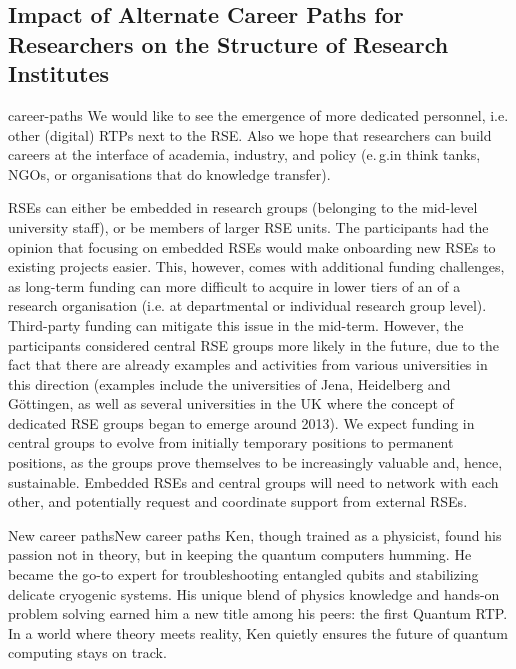 \documentclass{eceasst}
\newcommand{\eg}{e.\,g.}
\begin{document}
\subsection{Impact of Alternate Career Paths for Researchers on the Structure of Research Institutes}
\begin{whatis}{}{career-paths}
We would like to see the emergence of more dedicated personnel, i.e. other (digital) RTPs next to the RSE.
Also we hope that researchers can build careers at the interface of academia, industry, and policy (\eg in think tanks, NGOs,
or organisations that do knowledge transfer).
\end{whatis}
RSEs can either be embedded in research groups (belonging to the mid-level university staff),
or be members of larger RSE units.\cite{Kempf2025-draft}
The participants had the opinion that focusing on embedded RSEs would make onboarding new RSEs to existing projects easier.
This, however, comes with additional funding challenges,
as long-term funding can more difficult to acquire in lower tiers of an of a research organisation (i.e. at departmental or individual research group level).
Third-party funding can mitigate this issue in the mid-term.
However, the participants considered central RSE groups more likely in the future,
due to the fact that there are already examples and activities from various universities in this direction
(examples include the universities of Jena, Heidelberg and Göttingen, as well as several universities in the UK where the concept of dedicated RSE groups began to emerge around 2013).
We expect funding in central groups to evolve from initially temporary positions to permanent positions,
as the groups prove themselves to be increasingly valuable and, hence, sustainable.
Embedded RSEs and central groups will need to network with each other,
and potentially request and coordinate support from external RSEs.

\begin{story}{New career paths}{New career paths}
Ken, though trained as a physicist, found his passion not in theory, but in keeping the quantum computers humming. He became the go-to expert for troubleshooting entangled qubits and stabilizing delicate cryogenic systems. His unique blend of physics knowledge and hands-on problem solving earned him a new title among his peers: the first Quantum RTP. In a world where theory meets reality, Ken quietly ensures the future of quantum computing stays on track.
\end{story}
\end{document}
